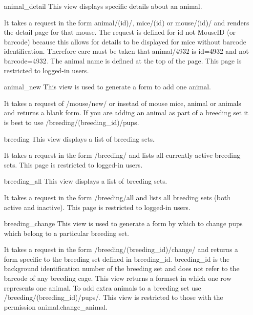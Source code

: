 \documentclass[letterpaper,10pt,english]{sphinxmanual}
\begin{document}
\hypertarget{animal.views.animal_detail}{}\begin{memberdesc}{animal\_detail}
This view displays specific details about an animal.

It takes a request in the form animal/(id)/, mice/(id) or mouse/(id)/ and renders the detail page for that mouse.  The request is defined for id not MouseID (or barcode) because this allows for details to be displayed for mice without barcode identification.
Therefore care must be taken that animal/4932 is id=4932 and not barcode=4932.  The animal name is defined at the top of the page.
This page is restricted to logged-in users.
\end{memberdesc}

\hypertarget{animal.views.animal_new}{}\begin{memberdesc}{animal\_new}
This view is used to generate a form to add one animal.

It takes a request of /mouse/new/ or insetad of mouse mice, animal or animals and returns a blank form.
If you are adding an animal as part of a breeding set it is best to use /breeding/(breeding\_id)/pups.
\end{memberdesc}

\hypertarget{animal.views.breeding}{}\begin{memberdesc}{breeding}
This view displays a list of breeding sets.

It takes a request in the form /breeding/ and lists all currently active breeding sets.
This page is restricted to logged-in users.
\end{memberdesc}

\hypertarget{animal.views.breeding_all}{}\begin{memberdesc}{breeding\_all}
This view displays a list of breeding sets.

It takes a request in the form /breeding/all and lists all breeding sets (both active and inactive).
This page is restricted to logged-in users.
\end{memberdesc}

\hypertarget{animal.views.breeding_change}{}\begin{memberdesc}{breeding\_change}
This view is used to generate a form by which to change pups which belong to a particular breeding set.

It takes a request in the form /breeding/(breeding\_id)/change/ and returns a form specific to the breeding set defined in breeding\_id.  breeding\_id is the background identification number of the breeding set and does not refer to the barcode of any breeding cage.
This view returns a formset in which one row represents one animal.  To add extra animals to a breeding set use /breeding/(breeding\_id)/pups/.
This view is restricted to those with the permission animal.change\_animal.
\end{memberdesc}
\end{document}
